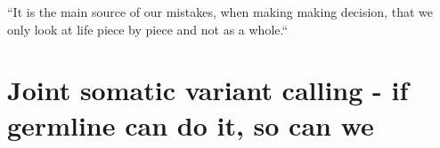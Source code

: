 
\begin{savequote}[85mm]
``It is the main source of our mistakes,  when making making decision, that we only look at life piece by piece and not as a whole.``
\end{savequote}

\chapter[Joint somatic variant calling]{Joint somatic variant calling - if germline can do it, so can we}
\label{ch:variantcalling}











